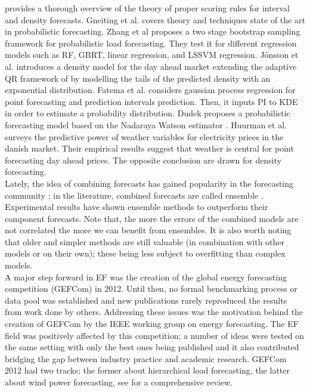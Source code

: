 provides a thorough overview of the theory of proper scoring rules for interval and density forecasts.
Gneiting et al. \cite{gneiting2014probabilistic}
covers theory and techniques state of the art in probabilistic forecasting.
Zhang et al \cite{zhang2020two} proposes a two stage bootstrap sampling framework for probabilistic load forecasting. They test it for different regression models such as RF, GBRT, linear regression, and LSSVM regression.
Jónsson et al. \cite{jonsson2014predictive}
introduces a density model for the day ahead market extending the adaptive QR framework of \cite{moller2008time} by modelling the tails of the predicted density with an exponential distribution.
Fatema et al. \cite{fatema2023probabilistic} considers gaussian process regression for point forecasting and prediction intervals prediction. Then, it inputs PI to KDE in order to estimate a probability distribution.
Dudek \cite{dudek2018probabilistic} proposes a probabilistic forecasting model based on the Nadaraya Watson estimator \cite{nadaraya1964estimating} \cite{watson1964smooth}.
Huurman et al. \cite{huurman2012power} surveys the predictive power of weather variables for electricity prices in the danish market. Their empirical results suggest that weather is central for point forecasting day ahead prices. The opposite conclusion are drawn for density forecasting.
\\
Lately, the idea of combining forecasts has gained popularity in the forecasting community \cite{forecasting_big}; in the literature, combined forecasts are called ensemble \cite{gneiting_weather_ensemble}.
Experimental results have shown ensemble methods to outperform their component forecasts.
Note that, the more the errors of the combined models are not correlated the more we can benefit from ensembles.
It is also worth noting that older and simpler methods are still valuable (in combination with other models or on their own); these being less subject to overfitting than complex models.
\\
A major step forward in EF was the creation of the global energy forecasting competition (GEFCom) in 2012. Until then, no formal benchmarking process or data pool was established and new publications rarely reproduced the results from work done by others. Addressing these issues was the motivation behind the creation of GEFCom by the IEEE working group on energy forecasting. The EF field was positively affected by this competition; a number of ideas were tested on the same setting with only the best ones being published and it also contributed bridging the gap between industry practice and academic research. GEFCom 2012 had two tracks; the former about hierarchical load forecasting, the latter about wind power forecasting, see \cite{hong2014global} for a comprehensive review. 

